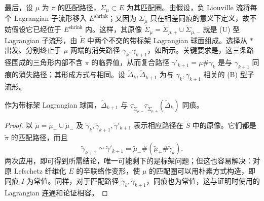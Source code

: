 最后，设 $\mu$ 为 $\pi$ 的匹配路径，$\Sigma_\mu\subset E$ 为其匹配圈。由假设，负 Liouville 流将每个 Lagrangian 子流形移入 $E^{\mathrm{shrink}}$；又因为 $\Sigma_\mu$ 只在相差同痕的意义下定义，故不妨假设它已经位于 $E^{\mathrm{shrink}}$ 内。这样，其原像 $\widetilde\Sigma_\mu=\widetilde\Sigma_{\mu,+}\cup\widetilde\Sigma_{\mu,-}$ 就是 (U) 型 Lagrangian 子流形，由 $\widetilde E$ 中两个不交的带标架 Lagrangian 球面组成。选择从 $*$ 出发、分别终止于 $\mu$ 两端的消失路径 $\gamma_k,\gamma_{k+1}$，如所示。关键要求是，这三条路径围成的三角形内部不含 $\pi$ 的临界值，从而复合路径 $\gamma'_{k+1}=\mu\#\gamma_k$ 是与 $\gamma_{k+1}$ 同痕的消失路径；其形成方式与相同。设 $\widetilde\Delta_k,\widetilde\Delta_{k+1}$ 为与 $\gamma_k,\gamma_{k+1}$ 相关的 (B) 型子流形。
\begin{lemma}\label{st:18.4}
作为带标架 Lagrangian 球面，$\widetilde\Delta_{k+1}$ 与 $\tau_{\widetilde\Sigma_{\mu,-}}\tau_{\widetilde\Sigma_{\mu,+}}(\widetilde\Delta_k)$ 同痕。
\end{lemma}
\begin{proof}
以 $\widetilde\mu=\widetilde\mu_+\cup\widetilde\mu_-$ 及 $\widetilde\gamma_k,\widetilde\gamma_{k+1},\widetilde\gamma'_{k+1}$ 表示相应路径在 $\widetilde S$ 中的原像。它们都是 $\widetilde\pi$ 的匹配路径，而且
\[
\widetilde\gamma_{k+1}\simeq\widetilde\gamma'_{k+1}=\widetilde\mu_-\#(\widetilde\mu_+\#\widetilde\gamma_k).
\]
两次应用，即可得到所需结论，唯一可能剩下的是标架问题；但这也容易解决：对原 Lefschetz 纤维化 $E$ 的辛联络作变形，使 $\mu$ 的匹配圈可以用朴素方式构造，即同痕 $I$ 为常值。同样，对于匹配路径 $\widetilde\gamma_k,\widetilde\gamma_{k+1}$，同痕也为常值，这与证明时使用的 Lagrangian 连通和论证相容。
\end{proof}

